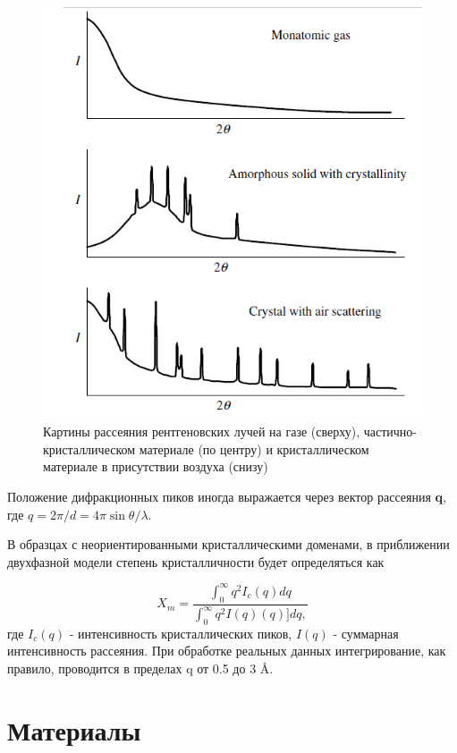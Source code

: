 \begin{figure}
    \centering
    \includegraphics[width = \linewidth]{fig/scattering.PNG}
    \caption{Картины рассеяния рентгеновских лучей на газе (сверху), частично-кристаллическом материале (по центру) и кристаллическом материале в присутствии воздуха (снизу)}
    \label{fig:scattering}
\end{figure}

Положение дифракционных пиков иногда выражается через вектор рассеяния \textbf{q}, где $q = 2\pi/d = 4\pi \sin \theta / \lambda$. 

В образцах с неориентированными кристаллическими доменами, в приближении двухфазной модели степень кристалличности будет определяться как 

\[
X_m = \frac{\int_0^{\infty} q^2 I_c(q) dq}{\int_0^{\infty} q^2 I(q)(q)] dq,}
\]
где $I_c(q)$ - интенсивность кристаллических пиков, $I(q)$ - суммарная интенсивность рассеяния.
При обработке реальных данных интегрирование, как правило, проводится в пределах q от 0.5 до 3 \AA.

\section{Материалы}

